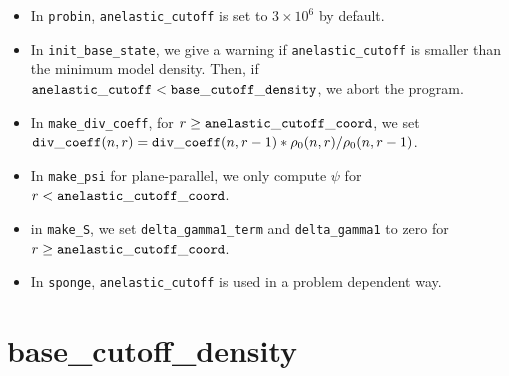 \begin{itemize}

\item In {\tt probin}, {\tt anelastic\_cutoff} is set to $3\times 10^6$ by default.

\item In {\tt init\_base\_state}, we give a warning if {\tt anelastic\_cutoff}
  is smaller than the minimum model density.  Then, if ${\tt anelastic\_cutoff} 
  < {\tt base\_cutoff\_density}$, we abort the program.

\item In {\tt make\_div\_coeff}, for 
  $r \ge {\tt anelastic\_cutoff\_coord}$, we set
  ${\tt div\_coeff}(n,r) = {\tt div\_coeff}(n,r-1) * \rho_0(n,r)/\rho_0(n,r-1)$.

\item In {\tt make\_psi} for plane-parallel, we only compute $\psi$ for 
  $r < {\tt anelastic\_cutoff\_coord}$.

\item in {\tt make\_S}, we set {\tt delta\_gamma1\_term} and {\tt delta\_gamma1} 
  to zero for $r \ge {\tt anelastic\_cutoff\_coord}$.

\item In {\tt sponge}, {\tt anelastic\_cutoff} is used in a problem
  dependent way.

\end{itemize}

\section{base\_cutoff\_density}\label{Sec:Base Cutoff Density}

